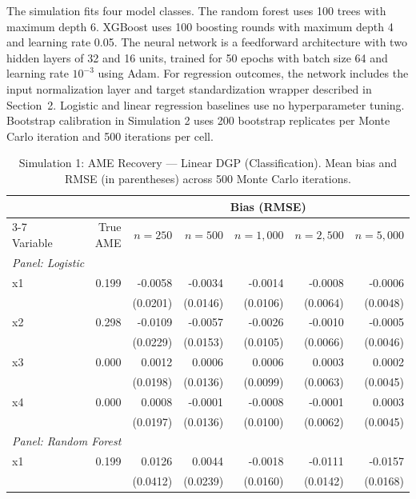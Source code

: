 \documentclass[conference]{IEEEtran}
\begin{document}
	The simulation fits four model classes. The random forest uses 100 trees with maximum depth 6. XGBoost uses 100 boosting rounds with maximum depth 4 and learning rate 0.05. The neural network is a feedforward architecture with two hidden layers of 32 and 16 units, trained for 50 epochs with batch size 64 and learning rate $10^{-3}$ using Adam. For regression outcomes, the network includes the input normalization layer and target standardization wrapper described in Section~2. Logistic and linear regression baselines use no hyperparameter tuning. Bootstrap calibration in Simulation 2 uses 200 bootstrap replicates per Monte Carlo iteration and 500 iterations per cell.
	
	\begin{table}[htbp]
		\centering
		\small
		\begin{threeparttable}
			\caption{Simulation 1: AME Recovery --- Linear DGP (Classification). Mean bias and RMSE (in parentheses) across 500 Monte Carlo iterations.}
			\label{tab:sim1_classification_linear}
			\begin{tabular}{lrrrrrr}
				\toprule
				& & \multicolumn{5}{c}{Bias (RMSE)} \\
				\cmidrule(lr){3-7}
				Variable & True AME & $n=250$ & $n=500$ & $n=1,000$ & $n=2,500$ & $n=5,000$ \\
				\midrule
				\multicolumn{7}{l}{\textit{Panel: Logistic}} \\
				\quad x1 & 0.199 & -0.0058 & -0.0034 & -0.0014 & -0.0008 & -0.0006 \\
				&  & (0.0201) & (0.0146) & (0.0106) & (0.0064) & (0.0048) \\
				\quad x2 & 0.298 & -0.0109 & -0.0057 & -0.0026 & -0.0010 & -0.0005 \\
				&  & (0.0229) & (0.0153) & (0.0105) & (0.0066) & (0.0046) \\
				\quad x3 & 0.000 & 0.0012 & 0.0006 & 0.0006 & 0.0003 & 0.0002 \\
				&  & (0.0198) & (0.0136) & (0.0099) & (0.0063) & (0.0045) \\
				\quad x4 & 0.000 & 0.0008 & -0.0001 & -0.0008 & -0.0001 & 0.0003 \\
				&  & (0.0197) & (0.0136) & (0.0100) & (0.0062) & (0.0045) \\
				\midrule
				\multicolumn{7}{l}{\textit{Panel: Random Forest}} \\
				\quad x1 & 0.199 & 0.0126 & 0.0044 & -0.0018 & -0.0111 & -0.0157 \\
				&  & (0.0412) & (0.0239) & (0.0160) & (0.0142) & (0.0168) \\

\end{tabular}
\end{threeparttable}
\end{table}
\end{document}

